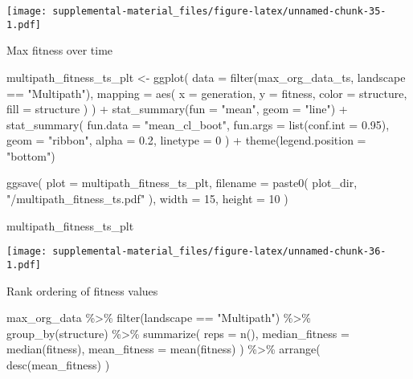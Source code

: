 \documentclass[
]{book}
\newenvironment{Shaded}{\begin{snugshade}}{\end{snugshade}}
\newcommand{\AttributeTok}[1]{\textcolor[rgb]{0.77,0.63,0.00}{#1}}
\newcommand{\DecValTok}[1]{\textcolor[rgb]{0.00,0.00,0.81}{#1}}
\newcommand{\FloatTok}[1]{\textcolor[rgb]{0.00,0.00,0.81}{#1}}
\newcommand{\FunctionTok}[1]{\textcolor[rgb]{0.00,0.00,0.00}{#1}}
\newcommand{\NormalTok}[1]{#1}
\newcommand{\OtherTok}[1]{\textcolor[rgb]{0.56,0.35,0.01}{#1}}
\newcommand{\SpecialCharTok}[1]{\textcolor[rgb]{0.00,0.00,0.00}{#1}}
\newcommand{\StringTok}[1]{\textcolor[rgb]{0.31,0.60,0.02}{#1}}
\begin{document}
\texttt{[image: supplemental-material\_files/figure-latex/unnamed-chunk-35-1.pdf]}

Max fitness over time

\begin{Shaded}
\begin{Highlighting}[]
\NormalTok{multipath\_fitness\_ts\_plt }\OtherTok{\textless{}{-}} \FunctionTok{ggplot}\NormalTok{(}
    \AttributeTok{data =} \FunctionTok{filter}\NormalTok{(max\_org\_data\_ts, landscape }\SpecialCharTok{==} \StringTok{"Multipath"}\NormalTok{),}
    \AttributeTok{mapping =} \FunctionTok{aes}\NormalTok{(}
      \AttributeTok{x =}\NormalTok{ generation,}
      \AttributeTok{y =}\NormalTok{ fitness,}
      \AttributeTok{color =}\NormalTok{ structure,}
      \AttributeTok{fill =}\NormalTok{ structure}
\NormalTok{    )}
\NormalTok{  ) }\SpecialCharTok{+}
  \FunctionTok{stat\_summary}\NormalTok{(}\AttributeTok{fun =} \StringTok{"mean"}\NormalTok{, }\AttributeTok{geom =} \StringTok{"line"}\NormalTok{) }\SpecialCharTok{+}
  \FunctionTok{stat\_summary}\NormalTok{(}
    \AttributeTok{fun.data =} \StringTok{"mean\_cl\_boot"}\NormalTok{,}
    \AttributeTok{fun.args =} \FunctionTok{list}\NormalTok{(}\AttributeTok{conf.int =} \FloatTok{0.95}\NormalTok{),}
    \AttributeTok{geom =} \StringTok{"ribbon"}\NormalTok{,}
    \AttributeTok{alpha =} \FloatTok{0.2}\NormalTok{,}
    \AttributeTok{linetype =} \DecValTok{0}
\NormalTok{  ) }\SpecialCharTok{+}
  \FunctionTok{theme}\NormalTok{(}\AttributeTok{legend.position =} \StringTok{"bottom"}\NormalTok{)}

\FunctionTok{ggsave}\NormalTok{(}
  \AttributeTok{plot =}\NormalTok{ multipath\_fitness\_ts\_plt,}
  \AttributeTok{filename =} \FunctionTok{paste0}\NormalTok{(}
\NormalTok{    plot\_dir,}
    \StringTok{"/multipath\_fitness\_ts.pdf"}
\NormalTok{  ),}
  \AttributeTok{width =} \DecValTok{15}\NormalTok{,}
  \AttributeTok{height =} \DecValTok{10}
\NormalTok{)}

\NormalTok{multipath\_fitness\_ts\_plt}
\end{Highlighting}
\end{Shaded}

\texttt{[image: supplemental-material\_files/figure-latex/unnamed-chunk-36-1.pdf]}

Rank ordering of fitness values

\begin{Shaded}
\begin{Highlighting}[]
\NormalTok{max\_org\_data }\SpecialCharTok{\%\textgreater{}\%}
  \FunctionTok{filter}\NormalTok{(landscape }\SpecialCharTok{==} \StringTok{"Multipath"}\NormalTok{) }\SpecialCharTok{\%\textgreater{}\%}
  \FunctionTok{group\_by}\NormalTok{(structure) }\SpecialCharTok{\%\textgreater{}\%}
  \FunctionTok{summarize}\NormalTok{(}
    \AttributeTok{reps =} \FunctionTok{n}\NormalTok{(),}
    \AttributeTok{median\_fitness =} \FunctionTok{median}\NormalTok{(fitness),}
    \AttributeTok{mean\_fitness =} \FunctionTok{mean}\NormalTok{(fitness)}
\NormalTok{  ) }\SpecialCharTok{\%\textgreater{}\%}
  \FunctionTok{arrange}\NormalTok{(}
    \FunctionTok{desc}\NormalTok{(mean\_fitness)}
\NormalTok{  )}
\end{Highlighting}
\end{Shaded}
\end{document}

